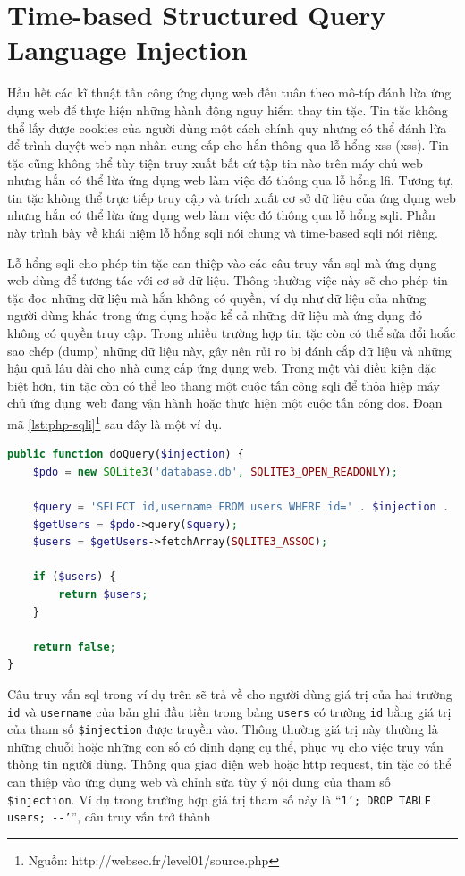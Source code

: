 \section{Time-based Structured Query Language Injection}
Hầu hết các kĩ thuật tấn công ứng dụng web đều tuân theo mô-típ đánh lừa ứng dụng web để thực hiện những hành động nguy hiểm thay tin tặc. Tin tặc không thể lấy được cookies của người dùng một cách chính quy nhưng có thể đánh lừa để trình duyệt web nạn nhân cung cấp cho hắn thông qua lỗ hổng \acrlong{xss} (\acrshort{xss}). Tin tặc cũng không thể tùy tiện truy xuất bất cứ tập tin nào trên máy chủ web nhưng hắn có thể lừa ứng dụng web làm việc đó thông qua lỗ hổng \acrshort{lfi}. Tương tự, tin tặc không thể trực tiếp truy cập và trích xuất cơ sở dữ liệu của ứng dụng web nhưng hắn có thể lừa ứng dụng web làm việc đó thông qua lỗ hổng \acrfull{sqli}. Phần này trình bày về khái niệm lỗ hổng \acrshort{sqli} nói chung và time-based \acrshort{sqli} nói riêng.\par
Lỗ hổng \acrfull{sqli} \parencite{li2011survey,sullivan2011web} cho phép tin tặc can thiệp vào các câu truy vấn \acrshort{sql} mà ứng dụng web dùng để tương tác với cơ sở dữ liệu. Thông thường việc này sẽ cho phép tin tặc đọc những dữ liệu mà hắn không có quyền, ví dụ như dữ liệu của những người dùng khác trong ứng dụng hoặc kể cả những dữ liệu mà ứng dụng đó không có quyền truy cập. Trong nhiều trường hợp tin tặc còn có thể sửa đổi hoắc sao chép (dump) những dữ liệu này, gây nên rủi ro bị đánh cắp dữ liệu và những hậu quả lâu dài cho nhà cung cấp ứng dụng web. Trong một vài điều kiện đặc biệt hơn, tin tặc còn có thể leo thang một cuộc tấn công \acrshort{sqli} để thỏa hiệp máy chủ ứng dụng web đang vận hành hoặc thực hiện một cuộc tấn công \acrshort{dos}. Đoạn mã \ref{lst:php-sqli}\footnote{Nguồn: http://websec.fr/level01/source.php} sau đây là một ví dụ.
\begin{lstlisting}[language=php, label={lst:php-sqli},caption={Đoạn mã PHP có lỗ hổng SQL Injection}]
public function doQuery($injection) {
    $pdo = new SQLite3('database.db', SQLITE3_OPEN_READONLY);
    
    $query = 'SELECT id,username FROM users WHERE id=' . $injection . ' LIMIT 1';
    $getUsers = $pdo->query($query);
    $users = $getUsers->fetchArray(SQLITE3_ASSOC);

    if ($users) {
        return $users;
    }

    return false;
}
\end{lstlisting}
Câu truy vấn \acrshort{sql} trong ví dụ trên sẽ trả về cho người dùng giá trị của hai trường \texttt{id} và \texttt{username} của bản ghi đầu tiền trong bảng \texttt{users} có trường \texttt{id} bằng giá trị của tham số \texttt{\$injection} được truyền vào. Thông thường giá trị này thường là những chuỗi hoặc những con số có định dạng cụ thể, phục vụ cho việc truy vấn thông tin người dùng. Thông qua giao diện web hoặc \acrshort{http} request, tin tặc có thể can thiệp vào ứng dụng web và chỉnh sửa tùy ý nội dung của tham số \texttt{\$injection}. Ví dụ trong trường hợp giá trị tham số này là ``\colorbox{gray!30}{\texttt{1'; DROP TABLE users; -{}-'}}'', câu truy vấn trở thành\\
